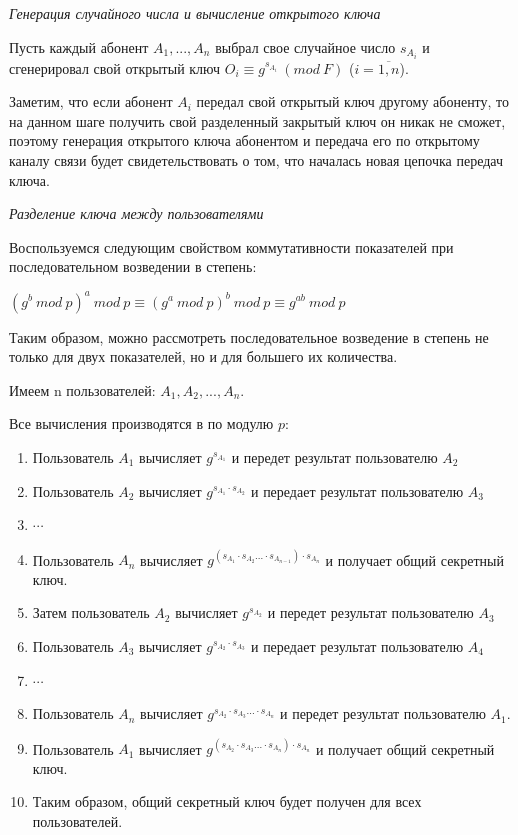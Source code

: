 \documentclass[bachelor, och, labwork]{shiza}
\begin{document}
\begin{center}
    \textit{Генерация случайного числа и вычисление открытого ключа}
\end{center}

Пусть каждый абонент $A_1,...,A_n$ выбрал свое случайное число $s_{A_i}$ и сгенерировал
свой открытый ключ $O_i \equiv g ^ {s_{A_i}} ~(mod ~ F)$ ($i = \overline{1, n} $).

Заметим, что если абонент $A_i$ передал свой открытый ключ другому абоненту, то
на данном шаге получить свой разделенный закрытый ключ он никак не сможет, поэтому
генерация открытого ключа абонентом и передача его по открытому каналу связи будет
свидетельствовать о том, что началась новая цепочка передач ключа.

\begin{center}
    \textit{Разделение ключа между пользователями}
\end{center}

Воспользуемся следующим свойством коммутативности показателей при последовательном
возведении в степень:
\begin{center}
    $(g^b ~mod ~ p)^ a ~ mod ~ p \equiv (g ^ a ~ mod ~ p) ^ b ~ mod ~ p \equiv g ^ {ab} ~ mod ~ p$
\end{center}

Таким образом, можно рассмотреть последовательное возведение в степень не только
для двух показателей, но и для большего их количества.

Имеем n пользователей: $A_1, A_2, ... , A_n$. 

Все вычисления производятся в по модулю $p$:

\begin{enumerate}
    \item Пользователь $A_1$ вычисляет $g^{s_{A_1}}$ и передет результат пользователю $A_2$
    \item Пользователь $A_2$ вычисляет $g^{s_{A_1} \cdot s_{A_2}}$ и передает результат пользователю $A_3$
    \item $\cdots$
    \item Пользователь $A_n$ вычисляет $g^{(s_{A_1} \cdot s_{A_2} ... \cdot s_{A_{n-1}}) \cdot s_{A_n}}$ и получает общий секретный ключ.
    \item Затем пользователь $A_2$ вычисляет $g^{s_{A_2}}$ и передет результат пользователю $A_3$
    \item Пользователь $A_3$ вычисляет $g^{s_{A_2} \cdot s_{A_3}}$ и передает результат пользователю $A_4$
    \item $\cdots$
    \item Пользователь $A_n$ вычисляет $g^{s_{A_2} \cdot s_{A_3} ... \cdot s_{A_n}}$ и передет результат пользователю $A_1$.
    \item Пользователь $A_1$ вычисляет $g^{(s_{A_2} \cdot s_{A_3} ... \cdot s_{A_{n}}) \cdot s_{A_n}}$ и получает общий секретный ключ. 
    \item Таким образом, общий секретный ключ будет получен для всех пользователей.
\end{enumerate}
\end{document}
